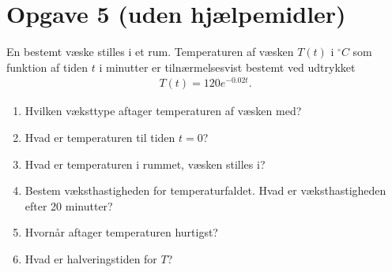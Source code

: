 \section*{Opgave 5 \large (uden hjælpemidler)}
En bestemt væske stilles i et rum. Temperaturen af væsken $T(t)$ i $^\circ C$ som funktion af tiden $t$ i minutter er tilnærmelsesvist bestemt ved udtrykket 
\begin{align*}
T(t) = 120e^{-0.02t}.
\end{align*}
\begin{enumerate}[label=\roman*)]
\item Hvilken væksttype aftager temperaturen af væsken med?
\item Hvad er temperaturen til tiden $t=0$? 
\item Hvad er temperaturen i rummet, væsken stilles i?
\item Bestem væksthastigheden for temperaturfaldet. Hvad er væksthastigheden efter 20 minutter?
\item Hvornår aftager temperaturen hurtigst?
\item Hvad er halveringstiden for $T$?
\end{enumerate}
